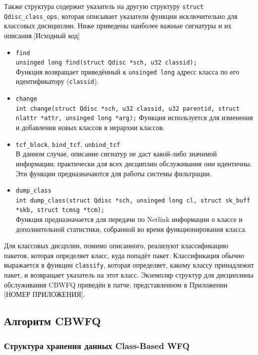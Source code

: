 	Также структура содержит указатель на другую структуру \lstinline{struct Qdisc_class_ops},
	которая описывает указатели функции исключительно для классовых дисициплин.
	Ниже приведены наиболее важные сигнатуры и их описания.[Исходный код]
	\begin{itemize}
		\item \lstinline{find}\\
			\lstinline{unsinged long find(struct Qdisc *sch, u32 classid);}\\
			Функция возвращает приведённый к \lstinline{unsinged long} адресс класса по его идентификатору (\lstinline{classid}).
		\item \lstinline{change} \\
			\lstinline{int change(struct Qdisc *sch, u32 classid, u32 parentid, struct nlattr *attr, unsinged long *arg);}
			Функция используется для изменения и добавления новых классов в иерархии классов. 
		\item \lstinline{tcf_block}, \lstinline{bind_tcf}, \lstinline{unbind_tcf}\\
			В данном случае, описание сигнатур не даст какой-либо значимой информации; практически
			для всех дисциплин обслуживания они идентичны. Эти функции предназначаются для работы
			системы фильтрации.
		\item \lstinline{dump_class}\\
			\lstinline{int dump_class(struct Qdisc *sch, unsinged long cl, struct sk_buff *skb, struct tcmsg *tcm);} \\
			Функция предназначается для передачи по Netlink информации о классе и дополнительной статистики, собранной
			во время функционирования класса.
	\end{itemize}

	Для классовых дисцплин, помимо описанного, реализуют классификацию пакетов, которая
	определяет класс, куда попадёт пакет. Классификация обычно выражается в функции \lstinline{classify},
	которая определяет, какому классу принадлежит пакет, и возвращает указатель на этот класс.
	Экземпляр структур для дисциплины обслуживания CBWFQ приведён в патче, представленном в Приложении
	[НОМЕР ПРИЛОЖЕНИЯ].

	\subsection{Алгоритм CBWFQ}

	
		\subsubsection{Структура хранения данных Class-Based WFQ}

